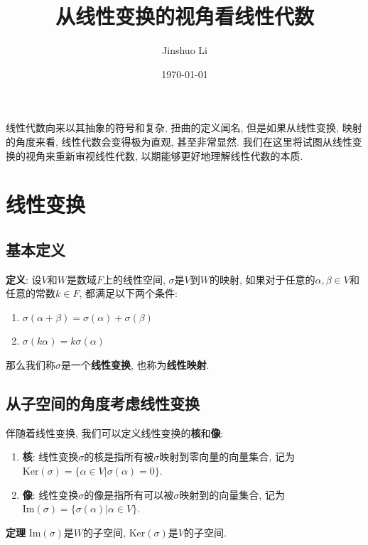 \documentclass{ctexart}
\begin{document}
\title{从线性变换的视角看线性代数}

\date{\today}

\author{Jinshuo Li}

\maketitle

线性代数向来以其抽象的符号和复杂, 扭曲的定义闻名, 但是如果从线性变换, 映射的角度来看, 线性代数会变得极为直观, 甚至非常显然. 我们在这里将试图从线性变换的视角来重新审视线性代数, 以期能够更好地理解线性代数的本质.

\section{线性变换}

\subsection{基本定义}

\textbf{定义}: 设$V$和$W$是数域$F$上的线性空间, $\sigma$是$V$到$W$的映射, 如果对于任意的$\alpha, \beta \in V$和任意的常数$k \in F$, 都满足以下两个条件:

\begin{enumerate}
    \item $\sigma(\alpha + \beta) = \sigma(\alpha) + \sigma(\beta)$
    \item $\sigma(k\alpha) = k\sigma(\alpha)$
\end{enumerate}

那么我们称$\sigma$是一个\textbf{线性变换}, 也称为\textbf{线性映射}.

\subsection{从子空间的角度考虑线性变换}

伴随着线性变换, 我们可以定义线性变换的\textbf{核}和\textbf{像}:
\begin{enumerate}
    \item \textbf{核}: 线性变换$\sigma$的核是指所有被$\sigma$映射到零向量的向量集合, 记为$\text{Ker}(\sigma) = \{\alpha \in V | \sigma(\alpha) = 0\}$.
    \item \textbf{像}: 线性变换$\sigma$的像是指所有可以被$\sigma$映射到的向量集合, 记为$\text{Im}(\sigma) = \{\sigma(\alpha) | \alpha \in V\}$.
\end{enumerate}

\textbf{定理} $\text{Im}(\sigma)$是$W$的子空间, $\text{Ker}(\sigma)$是$V$的子空间.
\end{document}
